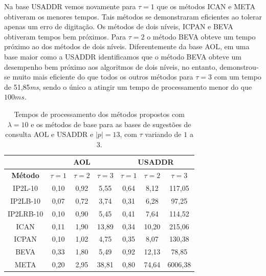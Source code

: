 Na base USADDR vemos novamente para $\tau=1$ que os métodos ICAN e META obtiveram os menores tempos. Tais métodos se demonstraram eficientes ao tolerar apenas um erro de digitação. Os métodos de dois níveis, ICPAN e BEVA obtiveram tempos bem próximos. Para $\tau=2$ o método BEVA obteve um tempo próximo ao dos métodos de dois níveis. Diferentemente da base AOL, em uma base maior como a USADDR identificamos que o método BEVA obteve um desempenho bem próximo aos algoritmos de dois níveis, no entanto, demonstrou-se muito mais eficiente do que todos os outros métodos para $\tau=3$ com um tempo de 51,85\textit{ms}, sendo o único a atingir um tempo de processamento menor do que $100ms$. 

\begin{table}[h]
\centering
\begin{tabular}{c|c|c|c|c|c|c|}
\cline{2-7}
 & \multicolumn{3}{c|}{\textbf{AOL}} & \multicolumn{3}{c|}{\textbf{USADDR}} \\ \hline
\multicolumn{1}{|c|}{\textbf{Método}} & $\tau=1$ & $\tau=2$ & $\tau=3$ & $\tau=1$ & $\tau=2$ & $\tau=3$ \\ \hline
\multicolumn{1}{|c|}{IP2L-10} & 0,10 & 0,92 & 5,55 & 0,64 & 8,12 & 117,05 \\ \hline
\multicolumn{1}{|c|}{IP2LB-10} & 0,07 & 0,72 & 3,74 & 0,31 & 6,28 & 97,25 \\ \hline
\multicolumn{1}{|c|}{IP2LRB-10} & 0,10 & 0,90 & 5,45 & 0,41 & 7,64 & 114,52 \\ \hline
\multicolumn{1}{|c|}{ICAN} & 0,11 & 1,90 & 13,89 & 0,34 & 10,20 & 215,06 \\ \hline
\multicolumn{1}{|c|}{ICPAN} & 0,10 & 1,02 & 4,75 & 0,35 & 8,07 & 130,38 \\ \hline
\multicolumn{1}{|c|}{BEVA} & 0,33 & 1,80 & 5,49 & 0,92 & 12,13 & 78,85 \\ \hline
\multicolumn{1}{|c|}{META} & 0,20 & 2,95 & 38,81 & 0,80 & 74,64 & 6006,38 \\ \hline
\end{tabular}
\caption{Tempos de processamento dos métodos propostos com $\lambda=10$ e os métodos de base para as bases de sugestões de consulta AOL e USADDR e $|p|=13$, com $\tau$ variando de $1$ a $3$.}
\label{tab:baselines-varying-tau-p-13}
\end{table}

